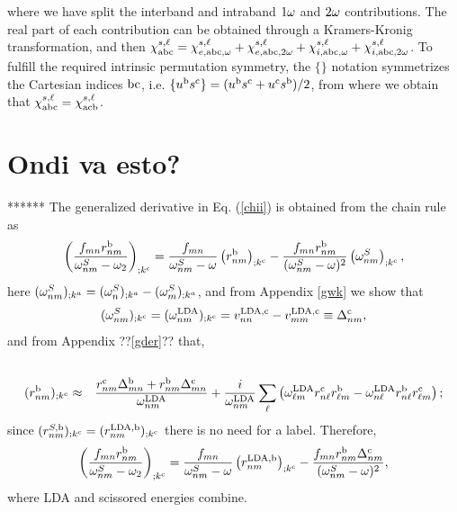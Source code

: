\documentclass{article}
\begin{document}
where we have split the interband and intraband $1\omega$ and $2\omega$
contributions. The real part of each contribution can be obtained through
a Kramers-Kronig transformation,\cite{nicolas} and then
$\chi^{s,\ell}_{\mathrm{a}\mathrm{b}\mathrm{c}}=\chi^{s,\ell}_{e,\mathrm{a}\mathrm{b}\mathrm{c},\omega}+\chi^{s,\ell}_{e,\mathrm{a}\mathrm{b}\mathrm{c},2\omega}+\chi^{s,\ell}_{i,\mathrm{a}\mathrm{b}\mathrm{c},\omega}+\chi^{s,\ell}_{i,\mathrm{a}\mathrm{b}\mathrm{c},2\omega}
$.
To 
fulfill the required intrinsic
permutation symmetry,\cite{rashkeev_efficient_1998} 
the
$\{\}$ notation symmetrizes the Cartesian indices $\mathrm{b}\mathrm{c}$, i.e. 
$\{u^{\mathrm{b}}s^{\mathrm{c}}\}=(u^{\mathrm{b}}s^{\mathrm{c}}+u^{\mathrm{c}}s^{\mathrm{b}})/2$,
from where we obtain that
$\chi_{\mathrm{a}\mathrm{b}\mathrm{c}}^{s,\ell}=\chi_{\mathrm{a}\mathrm{c}\mathrm{b}}^{s,\ell}$.




\section{Ondi va esto?}
******
The generalized derivative
in Eq. (\ref{chii}) is obtained from the chain rule as
\begin{equation}\label{gene}
\left(\frac{f_{mn}r_{nm}^{\mathrm{b}}}{\omega^S_{nm}-\omega_2}\right)_{;k^{\mathrm{c}}}=
\frac{f_{mn}}{\omega^S_{nm}-\omega}\left(r_{nm}^{\mathrm{b}}\right)_{;k^{\mathrm{c}}}
-\frac{f_{mn}r_{nm}^{\mathrm{b}}}{(\omega^S_{nm}-\omega)^2}\left(\omega^S_{nm}\right)_{;k^{\mathrm{c}}},
\end{equation} 
here $(\omega^S_{nm})_{;k^a}=(\omega^S_{n})_{;k^a}-(\omega^S_{m})_{;k^a}$, and 
from Appendix \ref{gwk} we show that 
\begin{equation}\label{wk}
(\omega^S_{nm})_{;k^{\mathrm{c}}}=(\omega^{\mathrm{LDA}}_{nm})_{;k^{\mathrm{c}}}=
v_{nn}^{\mathrm{LDA},\mathrm{c}}-v_{mm}^{\mathrm{LDA},\mathrm{c}}\equiv\Delta_{nm}^{\mathrm{c}}
,
\end{equation}
and from Appendix ??\ref{gder}?? that,\cite{nastos_scissors_2005}
\begin{eqnarray}\label{rgk}
\nonumber\\
(r^{\mathrm{b}}_{nm})_{;k^{\mathrm{c}}}
&\approx&
\frac{r_{nm}^{\mathrm{c}}\Delta_{mn}^{\mathrm{b}}+r_{nm}^{\mathrm{b}}\Delta_{mn}^{\mathrm{c}}}{\omega^{\mathrm{LDA}}_{nm}}
+\frac{i}{\omega^{\mathrm{LDA}}_{nm}}\sum_\ell\left(\omega^{\mathrm{LDA}}_{\ell m}r_{n\ell}^{\mathrm{c}}r_{\ell m}^{\mathrm{b}}
-\omega^{\mathrm{LDA}}_{n \ell}r_{n\ell}^{\mathrm{b}}r_{\ell m}^{\mathrm{c}}\right);
\end{eqnarray} 
since
$(r^{S,\mathrm{b}}_{nm})_{;k^{\mathrm{c}}}
=
(r^{\mathrm{LDA},\mathrm{b}}_{nm})_{;k^{\mathrm{c}}}
$ there is no need for a label.
Therefore,
\begin{equation}\label{gene2}
\left(\frac{f_{mn}r_{nm}^{\mathrm{b}}}{\omega^S_{nm}-\omega_2}\right)_{;k^{\mathrm{c}}}=
\frac{f_{mn}}{\omega^S_{nm}-\omega}\left(r_{nm}^{\mathrm{LDA},\mathrm{b}}\right)_{;k^{\mathrm{c}}}
-\frac{f_{mn}r_{nm}^{\mathrm{b}}\Delta_{nm}^{\mathrm{c}}}{(\omega^S_{nm}-\omega)^2}
,
\end{equation}
where LDA and scissored energies combine.
\end{document}

